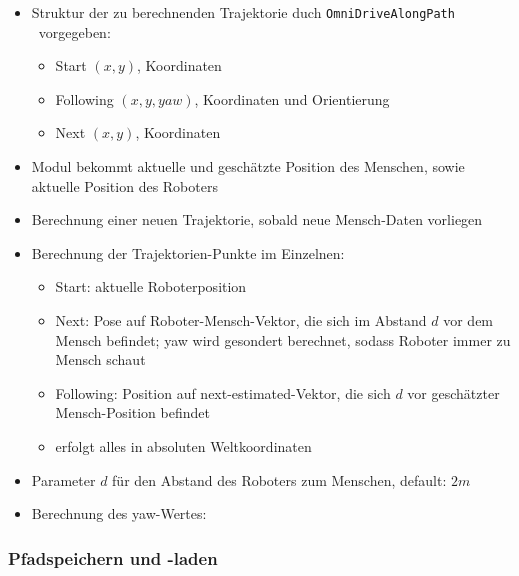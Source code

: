 \begin{itemize}
	\item Struktur der zu berechnenden Trajektorie duch \lstinline{OmniDriveAlongPath} \ vorgegeben:
	\begin{itemize}
		\item Start $(x,y)$, Koordinaten
		\item Following $(x,y,yaw)$, Koordinaten und Orientierung 
		\item Next $(x,y)$, Koordinaten
	\end{itemize}
	\item Modul bekommt aktuelle und geschätzte Position des Menschen, sowie aktuelle Position des Roboters
	\item Berechnung einer neuen Trajektorie, sobald neue Mensch-Daten vorliegen
	\item Berechnung der Trajektorien-Punkte im Einzelnen:
	\begin{itemize}
	  \item Start: aktuelle Roboterposition
	  \item Next: Pose auf Roboter-Mensch-Vektor, die sich im Abstand $d$ vor dem Mensch befindet; yaw wird gesondert berechnet, sodass Roboter immer zu Mensch schaut
	  \item Following: Position auf next-estimated-Vektor, die sich $d$ vor geschätzter Mensch-Position befindet
	  \item erfolgt alles in absoluten Weltkoordinaten
  \end{itemize}
  \item Parameter $d$ für den Abstand des Roboters zum Menschen, default: $2m$
  \item Berechnung des yaw-Wertes: 

\end{itemize}




\subsubsection{Pfadspeichern und -laden}

